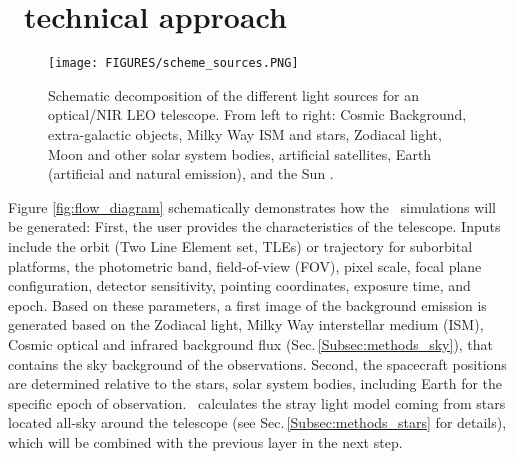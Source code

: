 \documentclass[usenames,dvipsnames,modern]{CLASS_FILES/aastex631}  %
\begin{document}
\section{\MyName\ technical approach}
\label{Sec:methods}
\begin{figure*}[t!]
 \begin{center}
\texttt{[image: FIGURES/scheme\_sources.PNG]}
\vspace{-0.85cm}
\caption{Schematic decomposition of the different light sources for an optical/NIR LEO telescope. From left to right: Cosmic Background, extra-galactic objects, Milky Way ISM and stars, Zodiacal light, Moon and other solar system bodies, artificial satellites, Earth (artificial and natural emission), and the Sun \citep[AB magnitudes for broad-band filter at 0.75 $\mu$m,][]{borlaff+2021arxiv2108.10321}.}
\label{fig:skylayers}
\end{center}
\end{figure*} 


Figure \ref{fig:flow_diagram} schematically demonstrates how the \MyName\ simulations will be generated: First, the user provides the characteristics of the telescope. Inputs include the orbit (Two Line Element set, TLEs) or trajectory for suborbital platforms, the photometric band, field-of-view (FOV), pixel scale, focal plane configuration, detector sensitivity, pointing coordinates, exposure time, and epoch. Based on these parameters, a first image of the background emission is generated based on the Zodiacal light, Milky Way interstellar medium (ISM), Cosmic optical and infrared background flux (Sec.\,\ref{Subsec:methods_sky}), that contains the sky background of the observations. Second, the spacecraft positions are determined relative to the stars, solar system bodies, including Earth for the specific epoch of observation. \MyName\ calculates the stray light model coming from stars located all-sky around the telescope (see Sec.\,\ref{Subsec:methods_stars} for details), which will be combined with the previous layer in the next step.\\ 
\end{document}
